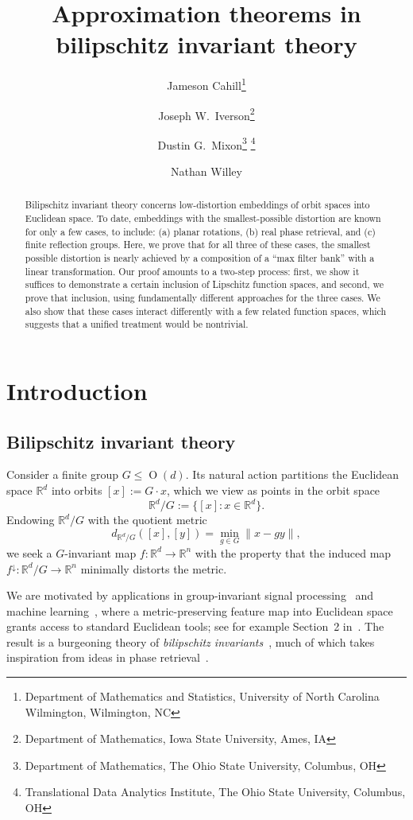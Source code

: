 \documentclass{article}
\title{Approximation theorems in bilipschitz invariant theory}
\author{Jameson Cahill\thanks{Department of Mathematics and Statistics, University of North Carolina Wilmington, Wilmington, NC} \and Joseph W.\ Iverson\thanks{Department of Mathematics, Iowa State University, Ames, IA} \and Dustin G.\ Mixon\thanks{Department of Mathematics, The Ohio State University, Columbus, OH} \thanks{Translational Data Analytics Institute, The Ohio State University, Columbus, OH} \and Nathan Willey\footnotemark[3]}
\date{}
\theoremstyle{plain}
\theoremstyle{definition}
\begin{document}
\maketitle

\begin{abstract}
Bilipschitz invariant theory concerns low-distortion embeddings of orbit spaces into Euclidean space.
To date, embeddings with the smallest-possible distortion are known for only a few cases, to include: (a) planar rotations, (b) real phase retrieval, and (c) finite reflection groups.
Here, we prove that for all three of these cases, the smallest possible distortion is nearly achieved by a composition of a ``max filter bank'' with a linear transformation.
Our proof amounts to a two-step process: first, we show it suffices to demonstrate a certain inclusion of Lipschitz function spaces, and second, we prove that inclusion, using fundamentally different approaches for the three cases.
We also show that these cases interact differently with a few related function spaces, which suggests that a unified treatment would be nontrivial.
\end{abstract}

\section{Introduction}

\subsection{Bilipschitz invariant theory}

Consider a finite group $G\leq\operatorname{O}(d)$.
Its natural action partitions the Euclidean space $\mathbb{R}^d$ into orbits $[x]:=G\cdot x$, which we view as points in the orbit space
\[
\mathbb{R}^d/G
:=\{[x]:x\in\mathbb{R}^d\}.
\]
Endowing $\mathbb{R}^d/G$ with the quotient metric
\[
d_{\mathbb{R}^d/G}([x],[y])
=\min_{g\in G}\|x-gy\|,
\]
we seek a $G$-invariant map $f\colon\mathbb{R}^d\to\mathbb{R}^n$ with the property that the induced map $f^\downarrow\colon\mathbb{R}^d/G\to\mathbb{R}^n$ minimally distorts the metric.

We are motivated by applications in group-invariant signal processing~\cite{BendoryBMZS:17,BandeiraBSKNWPW:23} and machine learning~\cite{BlumSV:23}, where a metric-preserving feature map into Euclidean space grants access to standard Euclidean tools; see for example Section~2 in~\cite{CahillIM:24}.
The result is a burgeoning theory of \textit{bilipschitz invariants}~\cite{ErikssonB:18,Derkson:24,DymG:25,DymWTLB:25}, much of which takes inspiration from ideas in phase retrieval~\cite{FreemanOPT:24,AmirBDE:26}.
\end{document}
